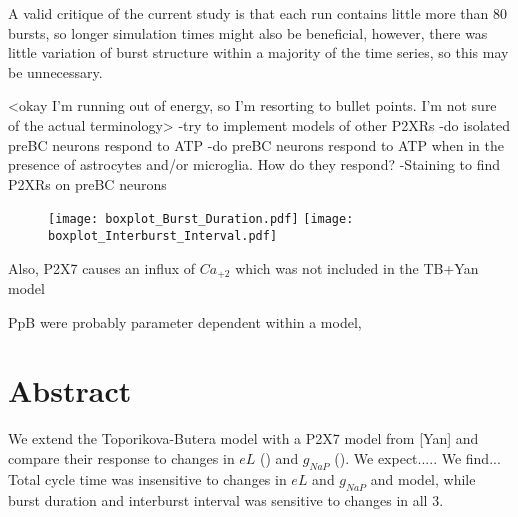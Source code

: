 \documentclass[11pt]{article}
\begin{document}
A valid critique of the current study is that each run contains little more than 80 bursts, so longer simulation times might also be beneficial,  however, there was little variation of burst structure within a  majority of the time series, so this may be unnecessary.

<okay I'm running out of energy, so I'm resorting to bullet points. I'm not sure of the actual terminology>
-try to implement models of other P2XRs
-do isolated preBC neurons respond to ATP
-do preBC neurons respond to ATP when in the presence of astrocytes and/or microglia. How do they respond?
-Staining to find P2XRs on preBC neurons


\begin{figure}[h]
\texttt{[image: boxplot\_Burst\_Duration.pdf]}
\texttt{[image: boxplot\_Interburst\_Interval.pdf]}
\end{figure}
Also, P2X7 causes an influx of $Ca_{+2}$ which was not included in the TB+Yan model




PpB were probably parameter dependent within a model,


 
 
 \section{Abstract}
We extend the Toporikova-Butera model with a P2X7 model from [Yan] and compare their response to changes in $eL$ () and $g_{NaP}$ ().
We expect.....
We find...
Total cycle time was insensitive to changes in $eL$ and $g_{NaP}$ and model, while burst duration and interburst interval was sensitive to changes in all 3.
 
\end{document}
